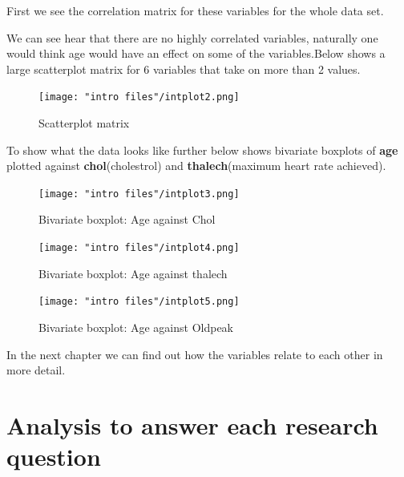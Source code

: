 \documentclass[a4paper]{article}
\begin{document}
First we see the correlation matrix for these variables for the whole data set.


We can see hear that there are no highly correlated variables, naturally one would think age would have an effect on some of the variables.Below shows a large scatterplot matrix for 6 variables that take on more than 2 values.

\begin{figure}[H]
	\begin{center}
		\texttt{[image: "intro files"/intplot2.png]}
	\end{center}
	\caption{Scatterplot matrix}
\end{figure}

To show what the data looks like further below shows bivariate boxplots of \textbf{age} plotted against \textbf{chol}(cholestrol) and \textbf{thalech}(maximum heart rate achieved).

\begin{figure}[H]
	\begin{center}
		\texttt{[image: "intro files"/intplot3.png]}
	\end{center}
	\caption{Bivariate boxplot: Age against Chol}
\end{figure}

\begin{figure}[H]
	\begin{center}
		\texttt{[image: "intro files"/intplot4.png]}
	\end{center}
	\caption{Bivariate boxplot: Age against thalech}
\end{figure}

\begin{figure}[H]
	\begin{center}
		\texttt{[image: "intro files"/intplot5.png]}
	\end{center}
	\caption{Bivariate boxplot: Age against Oldpeak}
\end{figure}


In the next chapter we can find out how the variables relate to each other in more detail.

\section{Analysis to answer each research question}
\end{document}
